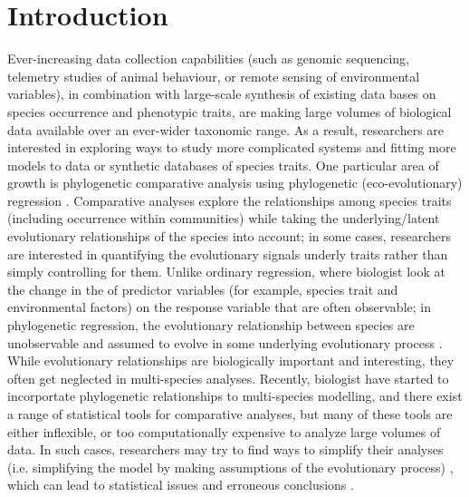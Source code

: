 \section{Introduction}

Ever-increasing data collection capabilities (such as genomic sequencing, telemetry studies of animal behaviour, or remote sensing of environmental variables), in combination with large-scale synthesis of existing data bases on species occurrence and phenotypic traits, are making large volumes of biological data available over an ever-wider taxonomic range.
As a result, researchers are interested in exploring ways to study more complicated systems and fitting more models to data or synthetic databases of species traits.
One particular area of growth is phylogenetic comparative analysis using phylogenetic (eco-evolutionary) regression \cite{hansen2012interpreting}. 
Comparative analyses explore the relationships among species traits (including occurrence within communities) while taking the underlying/latent evolutionary relationships of the species into account; in some cases, researchers are interested in quantifying the evolutionary signals underly traits rather than simply controlling for them.
Unlike ordinary regression, where biologist look at the change in the of predictor variables (for example, species trait and environmental factors) on the response variable that are often observable; in phylogenetic regression, the evolutionary relationship between species are unobservable and assumed to evolve in some underlying evolutionary process \citep{felsenstein1985phylogenies, butler2004phylogenetic}. 
While evolutionary relationships are biologically important and interesting, they often get neglected in multi-species analyses. 
Recently, biologist have started to incorportate phylogenetic relationships to multi-species modelling, and there exist a range of statistical tools for comparative analyses, but many of these tools are either inflexible, or too computationally expensive to analyze large volumes of data.
In such cases, researchers may try to find ways to simplify their analyses (i.e. simplifying the model by making assumptions of the evolutionary process) \citep{bunnefeld2012island, ord2010adaptation},
which can lead to statistical issues and erroneous conclusions
\cite{felsenstein1985phylogenies, li2017statistical}.
